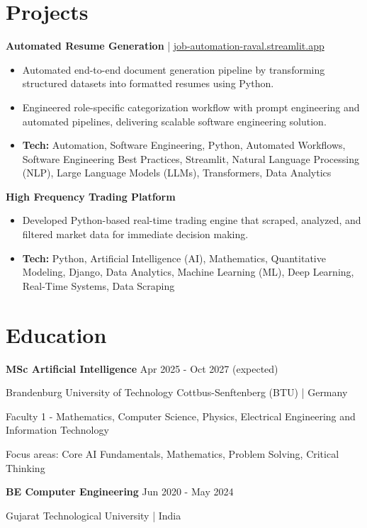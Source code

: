 \documentclass[a4paper,10pt]{article}
\begin{document}
\section*{Projects}
\textbf{Automated Resume Generation} | \href{https://job-automation-raval.streamlit.app/}{job-automation-raval.streamlit.app}\par
\begin{itemize}
\item Automated end-to-end document generation pipeline by transforming structured datasets into formatted resumes using Python.
\item Engineered role-specific categorization workflow with prompt engineering and automated pipelines, delivering scalable software engineering solution.
\item \textbf{Tech:} Automation, Software Engineering, Python, Automated Workflows, Software Engineering Best Practices, Streamlit, Natural Language Processing (NLP), Large Language Models (LLMs), Transformers, Data Analytics
\end{itemize}
\vspace{3pt}
\textbf{High Frequency Trading Platform}\par
\begin{itemize}
\item Developed Python-based real-time trading engine that scraped, analyzed, and filtered market data for immediate decision making.
\item \textbf{Tech:} Python, Artificial Intelligence (AI), Mathematics, Quantitative Modeling, Django, Data Analytics, Machine Learning (ML), Deep Learning, Real-Time Systems, Data Scraping
\end{itemize}
\vspace{3pt}

\section*{Education}
\textbf{MSc Artificial Intelligence} \hfill Apr 2025 - Oct 2027 (expected)\par
Brandenburg University of Technology Cottbus-Senftenberg (BTU) | Germany\par
Faculty 1 - Mathematics, Computer Science, Physics, Electrical Engineering and Information Technology\par
Focus areas: Core AI Fundamentals, Mathematics, Problem Solving, Critical Thinking\par
\vspace{3pt}
\textbf{BE Computer Engineering} \hfill Jun 2020 - May 2024\par
Gujarat Technological University | India\par
\vspace{3pt}
\end{document}
